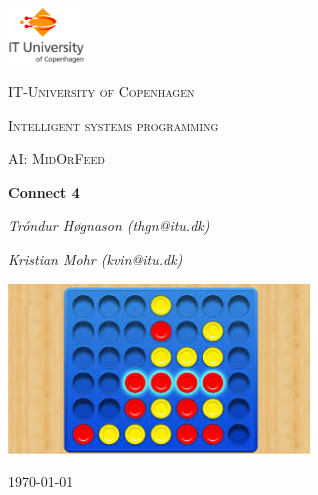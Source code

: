 
\begin{titlepage}
	\centering
	\includegraphics[width=0.15\textwidth]{logo}\par\vspace{1cm}
	{\scshape\LARGE IT-University of Copenhagen \par}
	\vspace{1cm}
	{\scshape\Large Intelligent systems programming\par}
	\vspace{.5cm}
	{\scshape\large AI: MidOrFeed\par}
	\vspace{1.5cm}
	{\huge\bfseries Connect 4\par}
	\vspace{2cm}
	{\Large\itshape Tróndur Høgnason (thgn@itu.dk)\par}
	{\Large\itshape Kristian Mohr (kvin@itu.dk)\par}
	\vspace{2 cm}
	\includegraphics[width=0.6\textwidth]{connect}\par\vspace{1cm}
\vspace{\fill}
	{\large \today\par}
\end{titlepage}